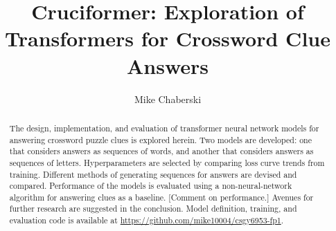 \documentclass[letterpaper]{article} %
\title{Cruciformer: Exploration of Transformers for Crossword Clue Answers}
\author {
    Mike Chaberski
}
\begin{document}
\maketitle

\begin{abstract}
    The design, implementation, and evaluation of transformer neural network models for answering crossword puzzle clues is explored herein. Two models are developed: one that considers answers as sequences of words, and another that considers answers as sequences of letters. Hyperparameters are selected by comparing loss curve trends from training. Different methods of generating sequences for answers are devised and compared. Performance of the models is evaluated using a non-neural-network algorithm for answering clues as a baseline. [Comment on performance.] Avenues for further research are suggested in the conclusion.
    Model definition, training, and evaluation code is available at \url{https://github.com/mike10004/csgy6953-fp1}.
\end{abstract}
\end{document}

